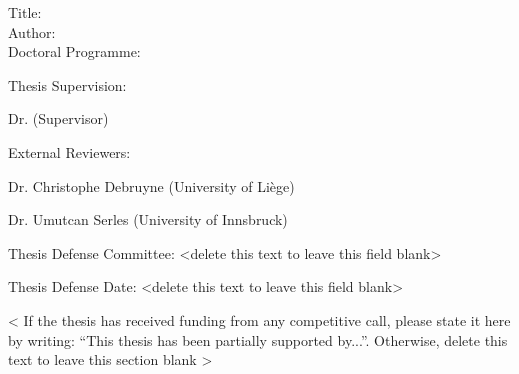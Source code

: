
\begin{spacing}{1.3}
Title: \thesisTitle \\
Author: \thesisAuthor \\
Doctoral Programme:	 \DoctoralProgramme
\end{spacing}
Thesis Supervision: 
\begin{mydescription}
    \item Dr. \supervisorDetails  (Supervisor)
\end{mydescription}

\vspace{10 mm}
External Reviewers: 
\begin{mydescription}
    \item Dr. Christophe Debruyne (University of Liège)
    \item Dr. Umutcan Serles (University of Innsbruck)
\end{mydescription}

\vspace{10 mm}

Thesis Defense Committee: <delete this text to leave this field blank>


\vspace{50mm}



Thesis Defense Date: <delete this text to leave this field blank>



\vspace{\fill}
\begin{spacing}{1.0}
< If the thesis has received funding from any competitive call, please state it here by writing: “This thesis has been partially supported by...”. Otherwise, delete this text to leave this section blank >
\end{spacing}


